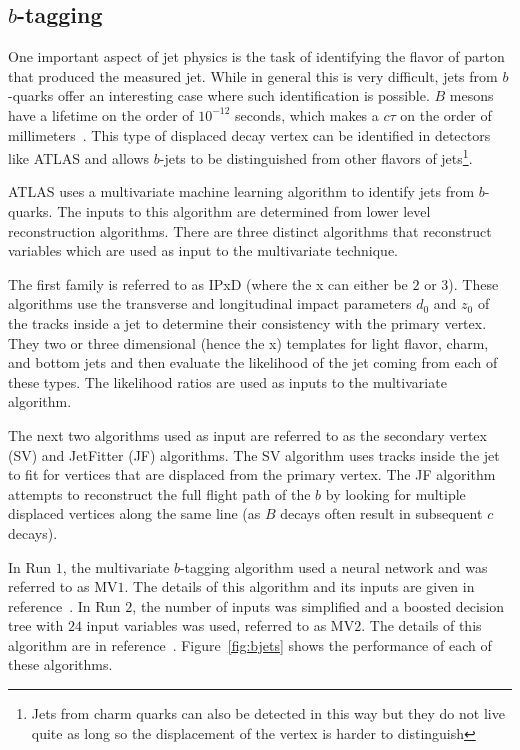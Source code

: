 \subsection{$b$-tagging}

One important aspect of jet physics is the task of identifying the flavor of parton that produced the measured jet. While in general this is very difficult, jets from $b$-quarks offer an interesting case where such identification is possible. $B$ mesons have a lifetime on the order of $10^{-12}$ seconds, which makes a $c\tau$ on the order of millimeters~\cite{PDG}. This type of displaced decay vertex can be identified in detectors like ATLAS and allows $b$-jets to be distinguished from other flavors of jets\footnote{Jets from charm quarks can also be detected in this way but they do not live quite as long so the displacement of the vertex is harder to distinguish}.

ATLAS uses a multivariate machine learning algorithm to identify jets from $b$-quarks. The inputs to this algorithm are determined from lower level reconstruction algorithms. There are three distinct algorithms that reconstruct variables which are used as input to the multivariate technique. 

The first family is referred to as IPxD (where the x can either be $2$ or $3$). These algorithms use the transverse and longitudinal impact parameters $d_0$ and $z_0$ of the tracks inside a jet to determine their consistency with the primary vertex. They two or three dimensional (hence the x) templates for light flavor, charm, and bottom jets and then evaluate the likelihood of the jet coming from each of these types. The likelihood ratios are used as inputs to the multivariate algorithm. 

The next two algorithms used as input are referred to as the secondary vertex (SV) and JetFitter (JF) algorithms. The SV algorithm uses tracks inside the jet to fit for vertices that are displaced from the primary vertex. The JF algorithm attempts to reconstruct the full flight path of the $b$ by looking for multiple displaced vertices along the same line (as $B$ decays often result in subsequent $c$ decays). 

In Run $1$, the multivariate $b$-tagging algorithm used a neural network and was referred to as MV$1$. The details of this algorithm and its inputs are given in reference~\cite{Run1BJets}. In Run $2$, the number of inputs was simplified and a boosted decision tree with $24$ input variables was used, referred to as MV$2$. The details of this algorithm are in reference~\cite{Run2BJets}. Figure~\ref{fig:bjets} shows the performance of each of these algorithms. 

